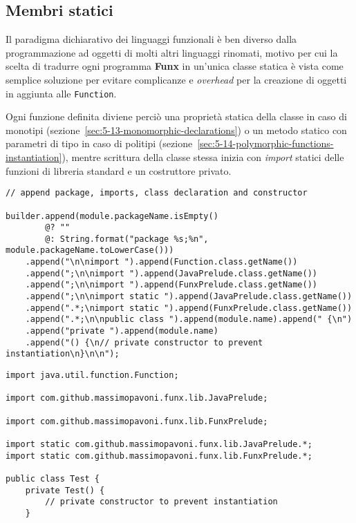 \subsection{Membri statici}
\label{sec:5-11-static-members}

Il paradigma dichiarativo dei linguaggi funzionali è ben diverso dalla programmazione ad oggetti di molti altri linguaggi rinomati,
motivo per cui la scelta di tradurre ogni programma \textbf{Funx} in un'unica classe statica è vista come semplice soluzione
per evitare complicanze e \textit{overhead} per la creazione di oggetti in aggiunta alle \texttt{Function}.


Ogni funzione definita diviene perciò una proprietà statica della classe in caso di monotipi (sezione~\ref{sec:5-13-monomorphic-declarations})
o un metodo statico con parametri di tipo in caso di politipi (sezione~\ref{sec:5-14-polymorphic-functions-instantiation}),
mentre scrittura della classe stessa inizia con \textit{import} statici delle funzioni di libreria standard e un costruttore privato.

\vspace{4mm}
\begin{lstlisting}[caption={Prime aggiunte alla stringa \texttt{Java}}, style=javaCode, label={lst:5-11-first-append-java}]
// append package, imports, class declaration and constructor

builder.append(module.packageName.isEmpty()
        @? ""
        @: String.format("package %s;%n", module.packageName.toLowerCase()))
    .append("\n\nimport ").append(Function.class.getName())
    .append(";\n\nimport ").append(JavaPrelude.class.getName())
    .append(";\n\nimport ").append(FunxPrelude.class.getName())
    .append(";\n\nimport static ").append(JavaPrelude.class.getName())
    .append(".*;\nimport static ").append(FunxPrelude.class.getName())
    .append(".*;\n\npublic class ").append(module.name).append(" {\n")
    .append("private ").append(module.name)
    .append("() {\n// private constructor to prevent instantiation\n}\n\n");
\end{lstlisting}
\vspace{4mm}
\begin{lstlisting}[caption={Corrispondente codice \texttt{Java} generato}, style=javaCode, label={lst:5-11-class-start-java}]
import java.util.function.Function;

import com.github.massimopavoni.funx.lib.JavaPrelude;

import com.github.massimopavoni.funx.lib.FunxPrelude;

import static com.github.massimopavoni.funx.lib.JavaPrelude.*;
import static com.github.massimopavoni.funx.lib.FunxPrelude.*;

public class Test {
    private Test() {
        // private constructor to prevent instantiation
    }    
\end{lstlisting}